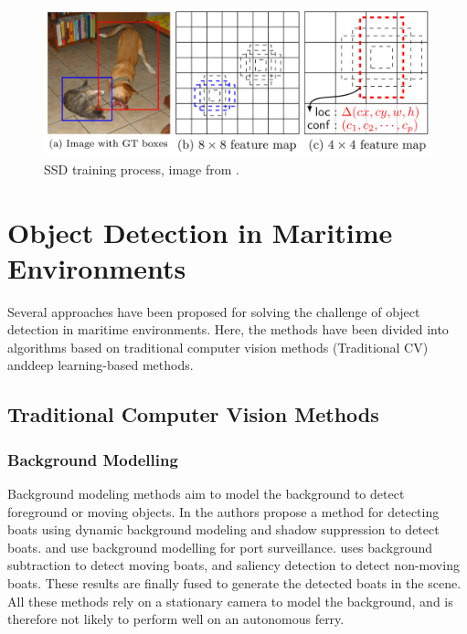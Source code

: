 \begin{figure}[h!]
    \centering
    \includegraphics[width=0.9 \textwidth]{images/ssd_train.png}
    \caption{SSD training process, image from \citep{SSD}.}
    \label{fig:ssd_training}
\end{figure}

\newpage

\section{Object Detection in Maritime Environments}
\label{sec:obj_det}

Several approaches have been proposed for solving the challenge of object detection in maritime environments. Here, the methods have been divided into algorithms based on traditional computer vision methods (Traditional CV) anddeep learning-based methods. 

\subsection{Traditional Computer Vision Methods}

\subsubsection{Background Modelling}
Background modeling methods aim to model the background to detect foreground or moving objects. In \citep{BackgroundWaveletSubstract} the authors propose a method for detecting boats using dynamic background modeling and shadow suppression to detect boats. \citep{SeeCoast} and \citep{Pires2010} use background modelling for port surveillance. \citep{Tran2016} uses background subtraction to detect moving boats, and saliency detection to detect non-moving boats. These results are finally fused to generate the detected boats in the scene. All these methods rely on a stationary camera to model the background, and is therefore not likely to perform well on an autonomous ferry.

